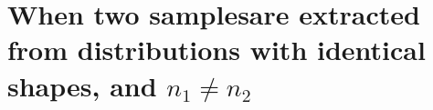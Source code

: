 \documentclass[
  man,floatsintext]{apa6}
\begin{document}
\hypertarget{when-two-samplesare-extracted-from-distributions-with-identical-shapes-and-n_1-neq-n_2}{%
\section{\texorpdfstring{When two samplesare extracted from distributions with identical shapes, and \(n_1 \neq n_2\)}{When two samplesare extracted from distributions with identical shapes, and n\_1 \textbackslash neq n\_2}}\label{when-two-samplesare-extracted-from-distributions-with-identical-shapes-and-n_1-neq-n_2}}
\end{document}
